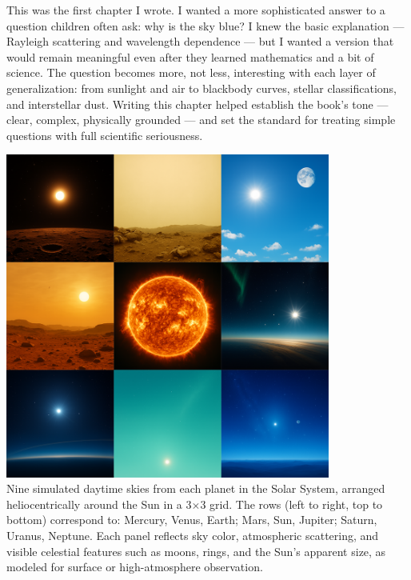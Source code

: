 \newpage

\begin{commentary}
This was the first chapter I wrote. I wanted a more sophisticated answer to a question children often ask: why is the sky blue? I knew the basic explanation --- Rayleigh scattering and wavelength dependence --- but I wanted a version that would remain meaningful even after they learned mathematics and a bit of science. The question becomes more, not less, interesting with each layer of generalization: from sunlight and air to blackbody curves, stellar classifications, and interstellar dust. Writing this chapter helped establish the book's tone --- clear, complex, physically grounded --- and set the standard for treating simple questions with full scientific seriousness.
\end{commentary}


\begin{center}
    \includegraphics[width=0.8\textwidth]{27_PlanetarySkyColors/SKIES.png}\\
    {Nine simulated daytime skies from each planet in the Solar System, arranged heliocentrically around the Sun in a 3$\times$3 grid. The rows (left to right, top to bottom) correspond to: Mercury, Venus, Earth; Mars, Sun, Jupiter; Saturn, Uranus, Neptune. Each panel reflects sky color, atmospheric scattering, and visible celestial features such as moons, rings, and the Sun's apparent size, as modeled for surface or high-atmosphere observation.
    }   
\end{center}